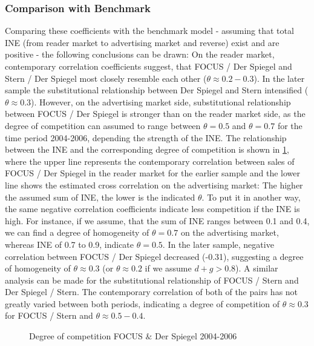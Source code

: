 \documentclass[12pt,a4paper]{scrreprt}
\begin{document}
\subsubsection{Comparison with Benchmark}
Comparing these coefficients with the benchmark model - assuming that total INE (from reader market to advertising market and reverse) exist and are positive -  the following conclusions can be drawn: On the reader market, contemporary correlation coefficients suggest, that FOCUS / Der Spiegel and Stern / Der Spiegel most closely resemble each other ($\theta\approx0.2-0.3$). In the later sample the substitutional relationship between Der Spiegel and Stern intensified ($\theta\approx0.3$). 
However, on the advertising market side, substitutional relationship between FOCUS / Der Spiegel is stronger than on the reader market side, as the degree of competition can assumed to range between $\theta=0.5$ and $\theta=0.7$ for the time period 2004-2006, depending the strength of the INE. The relationship between the INE and the corresponding degree of competition is shown in \ref{fig_QQ_fss}, where the upper line represents the contemporary correlation between sales of FOCUS / Der Spiegel in the reader market for the earlier sample and the lower line shows the estimated cross correlation on the advertising market: The higher the assumed sum of INE, the lower is the indicated $\theta$. To put it in another way, the same negative correlation coefficients indicate less competition if the INE is high. For instance, if we assume, that the sum of INE ranges between 0.1 and 0.4, we can find a degree of homogeneity of $\theta=0.7$ on the advertising market, whereas INE of 0.7 to 0.9, indicate $\theta=0.5$. In the later sample, negative correlation between FOCUS / Der Spiegel decreased (-0.31), suggesting a degree of homogeneity of $\theta\approx0.3$ (or $\theta\approx0.2$ if we assume $d+g>0.8$). A similar analysis can be made for the substitutional relationship of FOCUS / Stern and Der Spiegel / Stern. The contemporary correlation of both of the pairs has not greatly varied between both periods, indicating a degree of competition of $\theta\approx0.3$ for FOCUS / Stern and $\theta\approx0.5-0.4$. 

\begin{figure}[H]
	\centering
	\caption{Degree of competition FOCUS $\&$ Der Spiegel 2004-2006}
	\label{fig_QQ_fss}
	\begin{adjustbox}{width=\textwidth}	
	
\end{adjustbox}
\end{figure}
  
\end{document}
